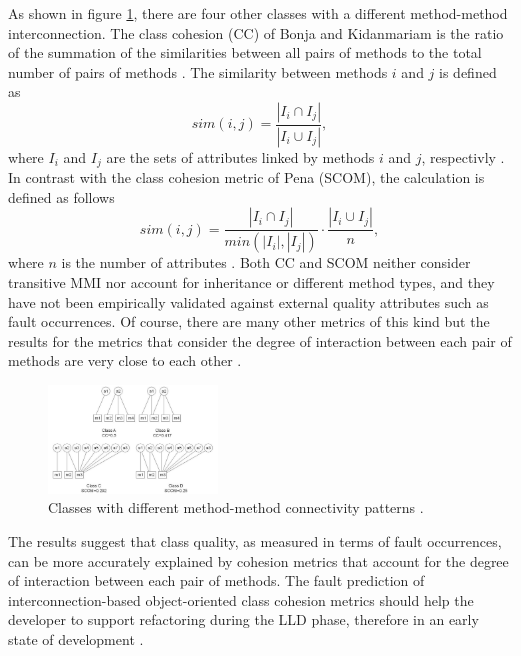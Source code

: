 As shown in figure \ref{fig2}, there are four other classes with a different method-method interconnection. The class cohesion (CC) of Bonja and Kidanmariam is the ratio of the summation of the similarities between all pairs of methods to the total number of pairs of methods \cite{bonja2006metrics}. The similarity between methods $i$ and $j$ is defined as
\begin{displaymath}
	sim(i,j)=\frac{|I_i \cap I_j|}{|I_i \cup I_j|} ,  
\end{displaymath}
where $I_i$ and $I_j$ are the sets of attributes linked by methods $i$ and $j$, respectivly \cite{b3al2012fault}. In contrast with the class cohesion metric of Pena (SCOM), the calculation is defined as follows
\begin{displaymath}
	sim(i,j)=\frac{|I_i \cap I_j|}{min(|I_i|, |I_j|)} \cdot \frac{|I_i \cup I_j|}{n},  
\end{displaymath}
where $n$ is the number of attributes \cite{fernandez2006sensitive}.
Both CC and SCOM neither consider transitive MMI nor account for inheritance or different method types, and they have not been empirically validated against external quality attributes such as fault occurrences. Of course, there are many other metrics of this kind but the results for the metrics that consider the degree of interaction between each pair of methods are very close to each other \cite{b8al2012precise}.

\begin{figure}[htbp]
	\centerline{\includegraphics[width=0.4\textwidth]{pictures/am2.png}}
	\caption{Classes with different method-method connectivity patterns \cite{b3al2012fault}.}
	\label{fig2}
\end{figure}

The results suggest that class quality, as measured in terms of fault occurrences, can be more accurately explained by cohesion metrics that account for the degree of interaction between each pair of methods. The fault prediction of interconnection-based object-oriented class cohesion metrics should help the developer to support refactoring during the LLD phase, therefore in an early state of development \cite{b8al2012precise}.


